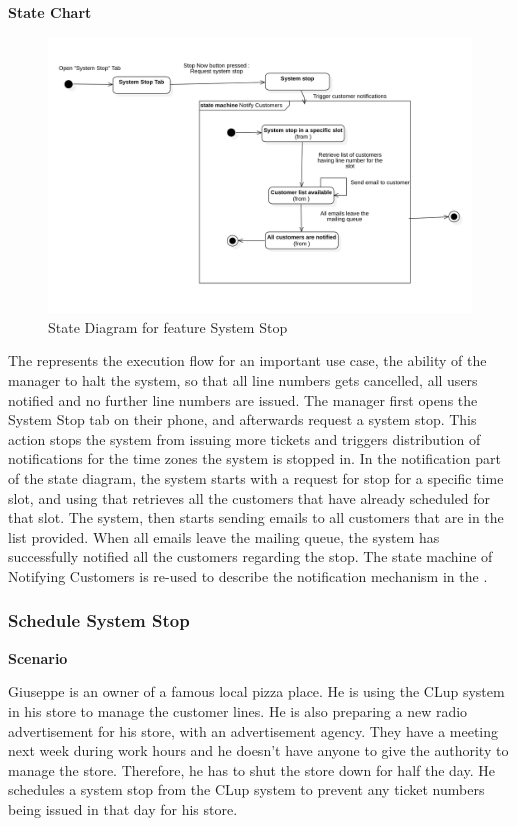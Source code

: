 \textbf{State Chart}

\begin{figure}[H]
    \centering
    \includegraphics[height=0.4\textwidth]{Images/StateCharts/SystemStop.png}
    \caption{State Diagram for feature System Stop}
    \label{fig:SDSystemStop}
\end{figure}

The  represents the execution flow for an important use case, the ability of the manager to halt the system, so that all line numbers gets cancelled, all users notified and no further line numbers are issued.
The manager first opens the System Stop tab on their phone, and afterwards request a system stop.
This action stops the system from issuing more tickets and triggers distribution of notifications for the time zones the system is stopped in.
In the notification part of the state diagram, the system starts with a request for stop for a specific time slot, and using that retrieves all the customers that have already scheduled for that slot.
The system, then starts sending emails to all customers that are in the list provided.
When all emails leave the mailing queue, the system has successfully notified all the customers regarding the stop.
The state machine of Notifying Customers is re-used to describe the notification mechanism in the .

\subsubsection{Schedule System Stop}

\textbf{Scenario}

Giuseppe is an owner of a famous local pizza place.
He is using the CLup system in his store to manage the customer lines.
He is also preparing a new radio advertisement for his store, with an advertisement agency.
They have a meeting next week during work hours and he doesn't have anyone to give the authority to manage the store.
Therefore, he has to shut the store down for half the day.
He schedules a system stop from the CLup system to prevent any ticket numbers being issued in that day for his store.

